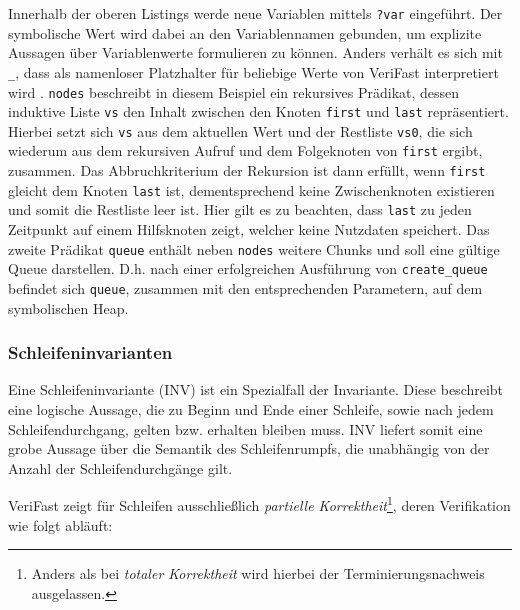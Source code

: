 \noindent
Innerhalb der oberen Listings werde neue Variablen mittels \texttt{?var} eingeführt. Der symbolische Wert wird dabei an den Variablennamen gebunden, um explizite Aussagen über Variablenwerte formulieren zu können. Anders verhält es sich mit \texttt{\_}, dass als namenloser Platzhalter für beliebige Werte von VeriFast interpretiert wird \cite{Jacobs2017}. \texttt{nodes} beschreibt in diesem Beispiel ein rekursives Prädikat, dessen induktive Liste \texttt{vs} den Inhalt zwischen den Knoten \texttt{first} und \texttt{last} repräsentiert. Hierbei setzt sich \texttt{vs} aus dem aktuellen Wert und der Restliste \texttt{vs0}, die sich wiederum aus dem rekursiven Aufruf und dem Folgeknoten von \texttt{first} ergibt, zusammen. Das Abbruchkriterium der Rekursion ist dann erfüllt, wenn \texttt{first} gleicht dem Knoten \texttt{last} ist, dementsprechend keine Zwischenknoten existieren und somit die Restliste leer ist. Hier gilt es zu beachten, dass \texttt{last} zu jeden Zeitpunkt auf einem Hilfsknoten zeigt, welcher keine Nutzdaten speichert. Das zweite Prädikat \texttt{queue} enthält neben \texttt{nodes} weitere Chunks und soll eine gültige Queue darstellen. D.h. nach einer erfolgreichen Ausführung von \texttt{create\_queue} befindet sich \texttt{queue}, zusammen mit den entsprechenden Parametern, auf dem symbolischen Heap.

\subsubsection{Schleifeninvarianten}

Eine Schleifeninvariante (INV) ist ein Spezialfall der Invariante. Diese beschreibt eine logische Aussage, die zu Beginn und Ende einer Schleife, sowie nach jedem Schleifendurchgang, gelten bzw. erhalten bleiben muss. INV liefert somit eine grobe Aussage über die Semantik des Schleifenrumpfs, die unabhängig von der Anzahl der Schleifendurchgänge gilt.

VeriFast zeigt für Schleifen ausschließlich \emph{partielle Korrektheit}\footnote{Anders als bei \emph{totaler Korrektheit} wird hierbei der Terminierungsnachweis ausgelassen.}, deren Verifikation wie folgt abläuft: \cite{Jacobs2017}

